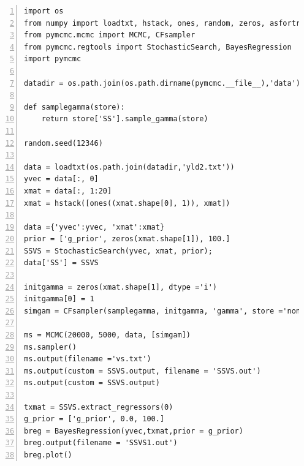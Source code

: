 \documentclass[article]{jss}
\begin{document}
\begin{lstlisting}[basicstyle={\scriptsize},numbers=left]
import os
from numpy import loadtxt, hstack, ones, random, zeros, asfortranarray, log
from pymcmc.mcmc import MCMC, CFsampler
from pymcmc.regtools import StochasticSearch, BayesRegression
import pymcmc

datadir = os.path.join(os.path.dirname(pymcmc.__file__),'data')

def samplegamma(store):
    return store['SS'].sample_gamma(store)

random.seed(12346)

data = loadtxt(os.path.join(datadir,'yld2.txt'))
yvec = data[:, 0]
xmat = data[:, 1:20]
xmat = hstack([ones((xmat.shape[0], 1)), xmat])

data ={'yvec':yvec, 'xmat':xmat}
prior = ['g_prior', zeros(xmat.shape[1]), 100.]
SSVS = StochasticSearch(yvec, xmat, prior);
data['SS'] = SSVS

initgamma = zeros(xmat.shape[1], dtype ='i')
initgamma[0] = 1
simgam = CFsampler(samplegamma, initgamma, 'gamma', store ='none')

ms = MCMC(20000, 5000, data, [simgam])
ms.sampler()
ms.output(filename ='vs.txt')
ms.output(custom = SSVS.output, filename = 'SSVS.out')
ms.output(custom = SSVS.output)

txmat = SSVS.extract_regressors(0)
g_prior = ['g_prior', 0.0, 100.]
breg = BayesRegression(yvec,txmat,prior = g_prior)
breg.output(filename = 'SSVS1.out')
breg.plot()
\end{lstlisting}
\end{document}
